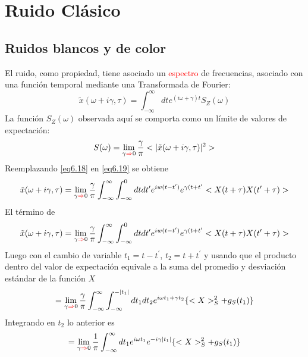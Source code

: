 \documentclass{book}
\begin{document}
\section{Ruido Clásico}
\subsection{Ruidos blancos y de color}
El ruido, como propiedad, tiene asociado un \textcolor{red}{espectro} de frecuencias, asociado con una función temporal mediante una Transformada de Fourier:
\begin{equation}\label{eq6.18}\tilde{x}(\omega+i\gamma, \tau)=\int_{-\infty}^{\infty} dt e^{(i\omega+\gamma)t}S_Z (\omega)\end{equation}
La función $S_Z(\omega)$ observada aquí se comporta como un límite de valores de expectación:
\begin{equation}\label{eq6.19}S(\omega)=\lim_{\gamma\textcolor{red}{\Rightarrow} 0}\frac{\gamma}{\pi}<\lvert\tilde{x}(\omega +i\gamma,\tau)\rvert^2>\end{equation} Reemplazando \ref{eq6.18} en  \ref{eq6.19} se obtiene
\begin{equation}\label{eq6.20}\tilde{x}(\omega+i\gamma, \tau)=\lim_{\gamma\textcolor{red}{\Rightarrow} 0}\frac{\gamma}{\pi}\int_{-\infty}^{\infty}\int_{-\infty}^0 dt dt^\prime e^{iw(t-t^\prime)}e^{\gamma(t+t^\prime}<X(t+\tau)X(t^\prime+\tau)>\end{equation} El término de 
\begin{equation}\label{eq6.21}\tilde{x}(\omega+i\gamma, \tau)=\lim_{\gamma\textcolor{red}{\Rightarrow} 0}\frac{\gamma}{\pi}\int_{-\infty}^{\infty}\int_{-\infty}^0 dt dt^\prime e^{iw(t-t^\prime)}e^{\gamma(t+t^\prime}<X(t+\tau)X(t^\prime+\tau)>\end{equation}
Luego con el cambio de variable $t_1=t-t^\prime$, $t_2=t+t^\prime$ y usando que el producto dentro del valor de expectación equivale a la suma del promedio y desviación estándar de la función $X$
\begin{equation}\label{eq6.22}=\lim_{\gamma\textcolor{red}{\Rightarrow} 0} \frac{\gamma}{\pi}\int_{-\infty}^\infty \int_{-\infty}^{-\lvert t_1\rvert}dt_1 dt_2 e^{i\omega t_1+\gamma t_2}\{<X>_S^2+g_S(t_1)\}\end{equation}
Integrando en $t_2$ lo anterior es
\begin{equation}\label{eq6.23}=\lim_{\gamma\textcolor{red}{\Rightarrow} 0}\frac{1}{\pi}\int_{-\infty}^\infty dt_1 e^{i\omega t_1 }e^{-i\gamma\lvert t_1\rvert}\{<X>_S^2+g_S(t_1)\}\end{equation}
\end{document}
